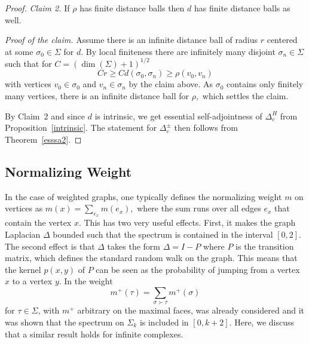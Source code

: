\documentclass[10pt]{amsart}
\theoremstyle{definition}
\begin{document}
\begin{proof}
\emph{Claim 2.} If  $\rho$ has finite distance balls then $d$ has finite distance balls as well.

\emph{Proof of the claim.}  Assume there is an infinite distance ball of radius $r$ centered at some $\sigma_{0}\in \Sigma$ for $d$. By local finiteness there are infinitely many disjoint $\sigma_{n}\in \Sigma$ such that  for $ C=(\dim(\Sigma)+1)^{1/2}$
 $$Cr\ge Cd(\sigma_{0},\sigma_{n})\geq \rho(v_{0},v_{n})$$
with vertices $v_{0}\in \sigma_{0}$ and $v_{n}\in \sigma_{n}$ by the claim above. As $\sigma_{0}$ contains only finitely many vertices, there is an infinite distance ball for $\rho,$ which settles the claim.


By Claim~2 and since $d$ is intrinsic, we get essential self-adjointness of $\Delta^H_c$ from Proposition~\ref{intrinsic}. The statement for $\Delta^\pm_c$ then follows from Theorem~\ref{esssa2}.\end{proof}



\subsection{Normalizing Weight}
In the case of weighted graphs, one typically defines the normalizing weight $m$ on vertices as $m(x) = \sum_{e_x}m(e_x),$ where the sum runs over all edges $e_x$ that contain the vertex $x$. This has two very useful effects. First, it makes the graph Laplacian $\Delta$ bounded such that the spectrum is contained in the interval $[0,2].$ 
The second effect is that $\Delta$ takes the form $\Delta = I-P$ where $P$ is the transition matrix, which defines the standard random walk on the graph.  This means that the kernel $p(x,y)$ of $P$ can be seen as the probability of jumping from a vertex $x$ to a vertex $y.$ 
In \cite[Theorem 3.2.]{HJ} the weight
\begin{equation*}
	 m^{+}(\tau) = \sum_{\sigma\succ\tau}m^{+}(\sigma)
\end{equation*}
for $\tau\in\Sigma$, with $m^{+}$ arbitrary on the maximal faces, was already considered and it was shown that the spectrum on $\Sigma_{k}$ is included in $[0,k+2]$. Here, we discuss that a similar result holds for infinite complexes.
\end{document}

